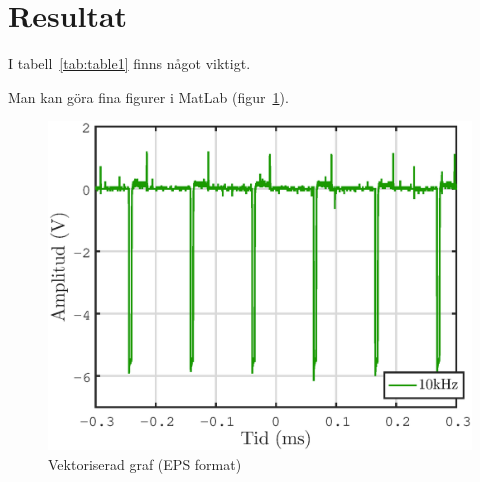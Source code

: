 \pagebreak
\section{Resultat}
I tabell~\ref{tab:table1} finns något viktigt.


Man kan göra fina figurer i MatLab (figur~\ref{fig:example}).

\begin{figure}[ht]
    \centering
    \captionsetup{justification=centering,margin=2cm}
    \includegraphics[scale=0.5]{Resources/Graphics/example1.eps}
    \caption{Vektoriserad graf (EPS format)}
    \label{fig:example}
\end{figure}